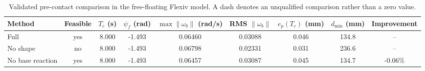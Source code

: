 \begin{table}[t]
\centering
\caption{Validated pre-contact comparison in the free-floating Flexiv model. A dash denotes an unqualified comparison rather than a zero value.}
\label{tab:precontact_comparison}
\begin{tabular}{lcccccccc}
\toprule
Method & Feasible & $T_c$ (s) & $\psi_f$ (rad) & $\max\|\omega_b\|$ (rad/s) & RMS $\|\omega_b\|$ & $e_p(T_c)$ (mm) & $d_{\min}$ (mm) & Improvement \\
\midrule
Full & yes & 8.000 & -1.493 & 0.06460 & 0.03088 & 0.046 & 134.8 & -- \\
No shape & no & 8.000 & -1.493 & 0.06798 & 0.02331 & 0.031 & 236.6 & -- \\
No base reaction & yes & 8.000 & -1.493 & 0.06457 & 0.03087 & 0.045 & 134.7 & -0.06\% \\
\bottomrule
\end{tabular}
\end{table}
